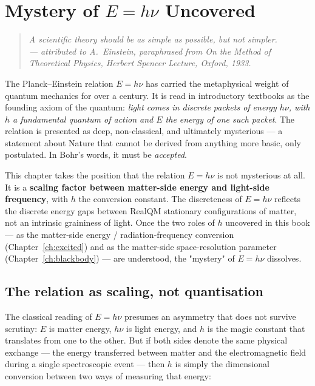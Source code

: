 \chapter{Mystery of $E = h\nu$ Uncovered}\label{ch:mystery-uncovered}

\begin{quote}
\itshape A scientific theory should be as simple as possible, but not simpler.\\
\normalfont\hfill --- attributed to A.~Einstein, paraphrased from \emph{On the Method of Theoretical Physics}, Herbert Spencer Lecture, Oxford, 1933.
\end{quote}
\bigskip

The Planck--Einstein relation $E = h\nu$ has carried the metaphysical weight of quantum mechanics for over a century. It is read in introductory textbooks as the founding axiom of the quantum: \emph{light comes in discrete packets of energy $h\nu$, with $h$ a fundamental quantum of action and $E$ the energy of one such packet}. The relation is presented as deep, non-classical, and ultimately mysterious --- a statement about Nature that cannot be derived from anything more basic, only postulated. In Bohr's words, it must be \emph{accepted}.

This chapter takes the position that the relation $E = h\nu$ is not mysterious at all. It is a \textbf{scaling factor between matter-side energy and light-side frequency}, with $h$ the conversion constant. The discreteness of $E = h\nu$ reflects the discrete energy gaps between RealQM stationary configurations of matter, not an intrinsic graininess of light. Once the two roles of $h$ uncovered in this book --- as the matter-side energy / radiation-frequency conversion (Chapter~\ref{ch:excited}) and as the matter-side space-resolution parameter (Chapter~\ref{ch:blackbody}) --- are understood, the "mystery" of $E = h\nu$ dissolves.

\section{The relation as scaling, not quantisation}\label{sec:hf-scaling}

The classical reading of $E = h\nu$ presumes an asymmetry that does not survive scrutiny: $E$ is matter energy, $h\nu$ is light energy, and $h$ is the magic constant that translates from one to the other. But if both sides denote the same physical exchange --- the energy transferred between matter and the electromagnetic field during a single spectroscopic event --- then $h$ is simply the dimensional conversion between two ways of measuring that energy:

